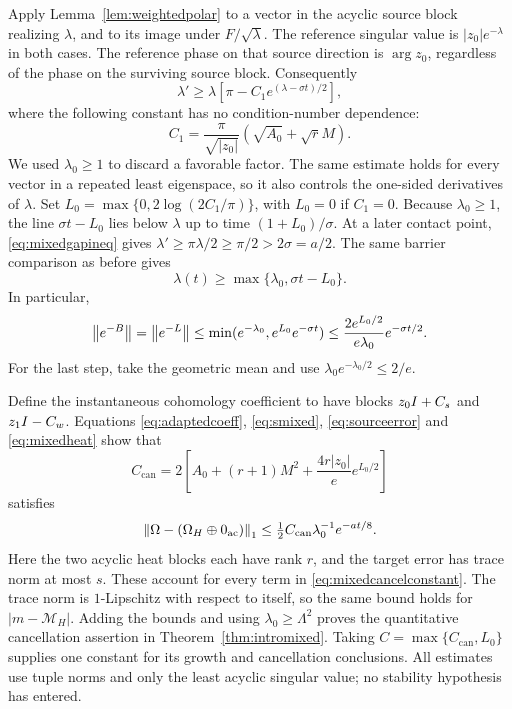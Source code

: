 Apply Lemma~\ref{lem:weightedpolar} to a vector in the acyclic source
block realizing $\lambda$, and to its image under $F/\sqrt\lambda$.
The reference singular value is $|z_0|e^{-\lambda}$ in both cases.
The reference phase on that source direction is $\arg z_0$,
regardless of the phase on the surviving source block.
Consequently
\begin{equation}\label{eq:mixedgapineq}
 \lambda'\geq\lambda
       \left[\pi-C_1e^{(\lambda-\sigma t)/2}\right],
\end{equation}
where the following constant has no condition-number dependence:
\[
 C_1=\frac{\pi}{\sqrt{|z_0|}}
 \left(\sqrt{A_0}+\sqrt r M\right).
\]
We used $\lambda_0\geq1$ to discard a favorable factor.
The same estimate holds for every vector in a repeated least
eigenspace, so it also controls the one-sided derivatives of $\lambda$.
Set $L_0=\max\{0,2\log(2C_1/\pi)\}$, with $L_0=0$ if $C_1=0$.
Because $\lambda_0\geq1$, the line $\sigma t-L_0$ lies below
$\lambda$ up to time $(1+L_0)/\sigma$. At a later contact point,
\eqref{eq:mixedgapineq} gives
$\lambda'\geq\pi\lambda/2\geq\pi/2>2\sigma=a/2$.
The same barrier comparison as before gives
\begin{equation}\label{eq:mixedgap}
 \lambda(t)\geq\max\{\lambda_0,\sigma t-L_0\}.
\end{equation}
In particular,
\begin{equation}\label{eq:mixedheat}
 \left\lVert e^{-B}\right\rVert=\left\lVert e^{-L}\right\rVert
 \leq\min(e^{-\lambda_0},e^{L_0}e^{-\sigma t})
 \leq\frac{2e^{L_0/2}}{e\lambda_0}e^{-\sigma t/2}.
\end{equation}
For the last step, take the geometric mean and use
$\lambda_0e^{-\lambda_0/2}\leq2/e$.

Define the instantaneous cohomology coefficient to have blocks
$z_0I+C_s$ and $z_1I-C_w$. Equations
\eqref{eq:adaptedcoeff}, \eqref{eq:smixed},
\eqref{eq:sourceerror} and \eqref{eq:mixedheat} show that
\begin{equation}\label{eq:mixedcancelconstant}
 C_{\mathrm{can}}=
 2\left[A_0+(r+1)M^2+\frac{4r|z_0|}{e}e^{L_0/2}\right]
\end{equation}
satisfies
\[
 \left\lVert\Omega-(\Omega_H\oplus0_{\mathrm{ac}})\right\rVert_1
 \leq\tfrac12 C_{\mathrm{can}}\lambda_0^{-1}e^{-at/8}.
\]
Here the two acyclic heat blocks each have rank $r$, and the target
error has trace norm at most $s$. These account for every term in
\eqref{eq:mixedcancelconstant}.
The trace norm is $1$-Lipschitz with respect to itself, so the same
bound holds for $|m-\mathcal M_H|$.
Adding the bounds and using $\lambda_0\geq\Lambda^2$ proves the
quantitative cancellation assertion in Theorem~\ref{thm:intromixed}.
Taking $C=\max\{C_{\mathrm{can}},L_0\}$ supplies one constant for its
growth and cancellation conclusions. All estimates use tuple norms and
only the least acyclic singular value; no stability hypothesis has entered.

